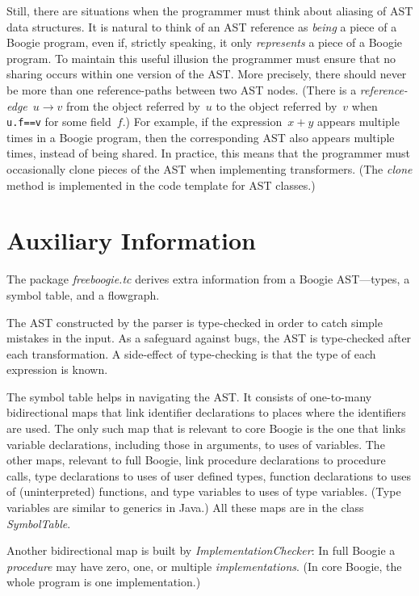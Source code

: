 \documentclass{llncs}
\newcommand{\jmlCode}{\lstinline[style=jml,basicstyle=\normalsize]}
\begin{document}
Still, there are situations when the programmer must think about
aliasing of AST data structures. It is natural to think of an
AST reference as \emph{being} a piece of a Boogie program,
even if, strictly speaking, it only \emph{represents} a piece
of a Boogie program. To maintain this useful illusion the
programmer must ensure that no sharing occurs within one version
of the AST\null. More precisely, there should never be more
than one reference-paths between two AST nodes. (There is a
\emph{reference-edge}~$u\to v$ from the object referred by~$u$
to the object referred by~$v$ when \jmlCode|u.f==v| for some
field~$f$.) For example, if the expression~$x+y$ appears multiple
times in a Boogie program, then the corresponding AST also
appears multiple times, instead of being shared. In practice,
this means that the programmer must occasionally clone pieces
of the AST when implementing transformers. (The \textit{clone}
method is implemented in the code template for AST classes.)

\section{Auxiliary Information} %

The package \textit{freeboogie.tc} derives extra information from
a Boogie AST---types, a symbol table, and a flowgraph.

The AST constructed by the parser is type-checked in order to
catch simple mistakes in the input. As a safeguard against bugs,
the AST is type-checked after each transformation. A side-effect
of type-checking is that the type of each expression is known.

The symbol table helps in navigating the AST\null. It consists of
one-to-many bidirectional maps that link identifier declarations
to places where the identifiers are used. The only such
map that is relevant to core Boogie is the one that links
variable declarations, including those in arguments, to uses
of variables. The other maps, relevant to full Boogie, link
procedure declarations to procedure calls, type declarations to
uses of user defined types, function declarations to uses of
(uninterpreted) functions, and type variables to uses of type
variables. (Type variables are similar to generics in Java.) All
these maps are in the class \textit{SymbolTable}.

Another bidirectional map is built by
\textit{ImplementationChecker}: In full Boogie a \emph{procedure}
may have zero, one, or multiple \emph{implementations}. (In core
Boogie, the whole program is one implementation.)
\end{document}
